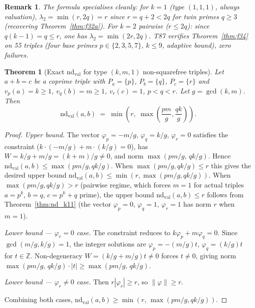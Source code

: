 \documentclass[12pt]{article}
\newtheorem{theorem}{Theorem}
\newtheorem{remark}{Remark}
\theoremstyle{definition}
\begin{document}
\begin{remark}
  The formula specialises cleanly: for $k=1$ (type $(1,1,1)$, always valuation),
  $\lambda_2 = \min(r, 2q) = r$ since $r = q+2 < 2q$ for twin primes $q \ge 3$
  (recovering Theorem~\ref{thm:f32a}).
  For $k=2$ pairwise ($r \le 2q$): since $q(k-1)=q \le r$, one has
  $\lambda_2 = \min(2r, 2q)$.  T87 verifies Theorem~\ref{thm:f34} on 55 triples
  (four base primes $p\in\{2,3,5,7\}$, $k \le 9$, adaptive bound), zero failures.
\end{remark}

\begin{theorem}[Exact $\mathrm{nd}_{\mathrm{val}}$ for type $(k,m,1)$ non-squarefree triples]\label{thm:nd_km1}
  Let $a + b = c$ be a coprime triple with $P_a = \{p\}$, $P_b = \{q\}$, $P_c = \{r\}$
  and $v_p(a) = k \ge 1$, $v_q(b) = m \ge 1$, $v_r(c) = 1$, $p < q < r$.
  Let $g = \gcd(k, m)$.  Then
  \[
    \mathrm{nd}_{\mathrm{val}}(a,b) \;=\; \min\!\left(r,\;\max\!\left(\frac{pm}{g},\frac{qk}{g}\right)\right).
  \]
\end{theorem}

\begin{proof}
  \textit{Upper bound.}
  The vector $\varphi_p = -m/g$, $\varphi_q = k/g$, $\varphi_r = 0$ satisfies
  the constraint ($k \cdot (-m/g) + m \cdot (k/g) = 0$),
  has $W = k/g + m/g = (k+m)/g \ne 0$,
  and norm $\max(pm/g,\, qk/g)$.
  Hence $\mathrm{nd}_{\mathrm{val}}(a,b) \le \max(pm/g, qk/g)$.
  When $\max(pm/g, qk/g) \le r$ this gives the desired upper bound
  $\mathrm{nd}_{\mathrm{val}}(a,b) \le \min(r, \max(pm/g, qk/g))$.
  When $\max(pm/g, qk/g) > r$ (pairwise regime, which forces $m=1$ for actual
  triples $a = p^k$, $b = q$, $c = p^k + q$ prime), the upper bound
  $\mathrm{nd}_{\mathrm{val}}(a,b) \le r$ follows from
  Theorem~\ref{thm:nd_k11} (the vector $\varphi_p = 0$, $\varphi_q = 1$, $\varphi_r = 1$
  has norm $r$ when $m = 1$).

  \textit{Lower bound — $\varphi_r = 0$ case.}
  The constraint reduces to $k\varphi_p + m\varphi_q = 0$.
  Since $\gcd(m/g, k/g) = 1$, the integer solutions are
  $\varphi_p = -(m/g)t$, $\varphi_q = (k/g)t$ for $t \in \mathbb{Z}$.
  Non-degeneracy $W = (k/g + m/g)t \ne 0$ forces $t \ne 0$, giving
  norm $\max(pm/g,\, qk/g) \cdot |t| \ge \max(pm/g,\, qk/g)$.

  \textit{Lower bound — $\varphi_r \ne 0$ case.}
  Then $r|\varphi_r| \ge r$, so $\|\varphi\| \ge r$.

  Combining both cases, $\mathrm{nd}_{\mathrm{val}}(a,b) \ge \min(r,\, \max(pm/g, qk/g))$.
\end{proof}
\end{document}
